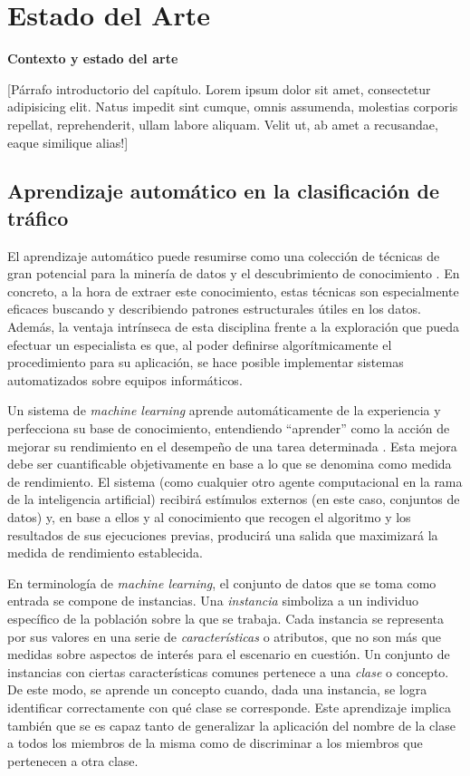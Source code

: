 \chapter{Estado del Arte}\label{chap:estadodelarte}
\textbf{Contexto y estado del arte}

[Párrafo introductorio del capítulo. Lorem ipsum dolor sit amet, consectetur adipisicing elit. Natus impedit sint cumque, omnis assumenda, molestias corporis repellat, reprehenderit, ullam labore aliquam. Velit ut, ab amet a recusandae, eaque similique alias!]

\section{Aprendizaje automático en la clasificación de tráfico}\label{sec:aprendizajeautomaticoenclasiftrafico}

El aprendizaje automático puede resumirse como una colección de técnicas de gran potencial para la minería de datos y el descubrimiento de conocimiento \cite{NA08}.
En concreto, a la hora de extraer este conocimiento, estas técnicas son especialmente eficaces buscando y describiendo patrones estructurales útiles en los datos.
Además, la ventaja intrínseca de esta disciplina frente a la exploración que pueda efectuar un especialista es que, al poder definirse algorítmicamente el procedimiento para su aplicación, se hace posible implementar sistemas automatizados sobre equipos informáticos.

Un sistema de \emph{machine learning} aprende automáticamente de la experiencia y perfecciona su base de conocimiento, entendiendo ``aprender'' como la acción de mejorar su rendimiento en el desempeño de una tarea determinada \cite{Simon_1983}.
Esta mejora debe ser cuantificable objetivamente en base a lo que se denomina como medida de rendimiento.
El sistema (como cualquier otro agente computacional en la rama de la inteligencia artificial) recibirá estímulos externos (en este caso, conjuntos de datos) y,
en base a ellos y al conocimiento que recogen el algoritmo y los resultados de sus ejecuciones previas, producirá una salida que maximizará la medida de rendimiento establecida.

En terminología de \emph{machine learning}, el conjunto de datos que se toma como entrada se compone de instancias.
Una \emph{instancia} simboliza a un individuo específico de la población sobre la que se trabaja.
Cada instancia se representa por sus valores en una serie de \emph{características} o atributos, que no son más que medidas sobre aspectos de interés para el escenario en cuestión.
Un conjunto de instancias con ciertas características comunes pertenece a una \emph{clase} o concepto.
De este modo, se aprende un concepto cuando, dada una instancia, se logra identificar correctamente con qué clase se corresponde.
Este aprendizaje implica también que se es capaz tanto de generalizar la aplicación del nombre de la clase a todos los miembros de la misma como de discriminar a los miembros que pertenecen a otra clase.

